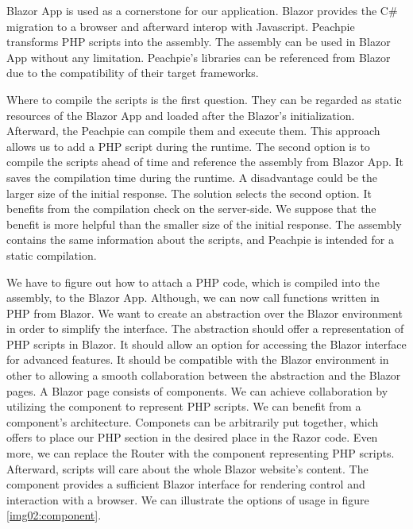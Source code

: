 Blazor App is used as a cornerstone for our application.
Blazor provides the C\# migration to a browser and afterward interop with Javascript.
Peachpie transforms PHP scripts into the assembly.
The assembly can be used in Blazor App without any limitation.
Peachpie's libraries can be referenced from Blazor due to the compatibility of their target frameworks.
\par
Where to compile the scripts is the first question.
They can be regarded as static resources of the Blazor App and loaded after the Blazor's initialization.
Afterward, the Peachpie can compile them and execute them.
This approach allows us to add a PHP script during the runtime.
The second option is to compile the scripts ahead of time and reference the assembly from Blazor App.
It saves the compilation time during the runtime.
A disadvantage could be the larger size of the initial response.
The solution selects the second option.
It benefits from the compilation check on the server-side.
We suppose that the benefit is more helpful than the smaller size of the initial response.
The assembly contains the same information about the scripts, and Peachpie is intended for a static compilation.
\par
We have to figure out how to attach a PHP code, which is compiled into the assembly, to the Blazor App.
Although, we can now call functions written in PHP from Blazor.
We want to create an abstraction over the Blazor environment in order to simplify the interface.
The abstraction should offer a representation of PHP scripts in Blazor.
It should allow an option for accessing the Blazor interface for advanced features.
It should be compatible with the Blazor environment in other to allowing a smooth collaboration between the abstraction and the Blazor pages.
A Blazor page consists of components.
We can achieve collaboration by utilizing the component to represent PHP scripts.
We can benefit from a component's architecture.
Componets can be arbitrarily put together, which offers to place our PHP section in the desired place in the Razor code.
Even more, we can replace the Router with the component representing PHP scripts.
Afterward, scripts will care about the whole Blazor website's content.
The component provides a sufficient Blazor interface for rendering control and interaction with a browser. 
We can illustrate the options of usage in figure \ref{img02:component}.
\par
